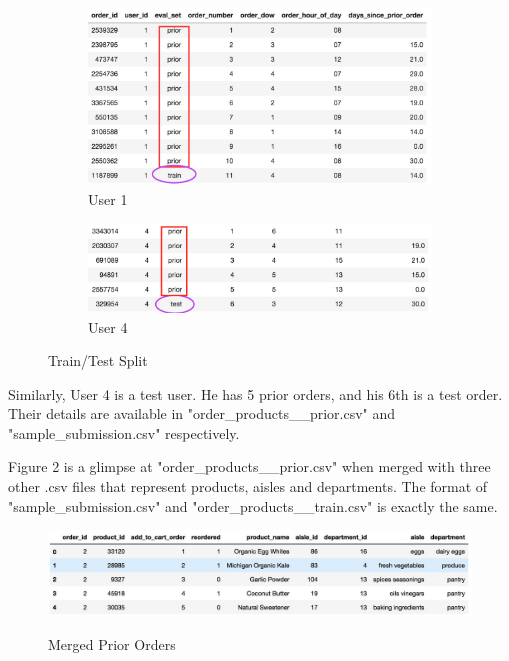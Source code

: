 \documentclass[letterpaper,12pt]{article}
\begin{document}
\begin{figure}[!bp]
  \begin{subfigure}[b]{0.4\textwidth}
    \includegraphics[width=\textwidth]{train_user.png}
    \caption{User 1}
    \label{fig:f1}
  \end{subfigure}
  \hfill
  \begin{subfigure}[b]{0.4\textwidth}
    \includegraphics[width=\textwidth]{test_user.png}
    \caption{User 4}
    \label{fig:f2}
  \end{subfigure}
  \caption{Train/Test Split}
\end{figure}

Similarly, User 4 is a test user. He has 5 prior orders, and his 6th is a test order. Their details are available in "order\_products\_\_prior.csv" and "sample\_submission.csv" respectively.

Figure 2 is a glimpse at "order\_products\_\_prior.csv" when merged with three other .csv files that represent products, aisles and departments. The format of "sample\_submission.csv" and "order\_products\_\_train.csv" is exactly the same.

\begin{figure}
	\centering
	\includegraphics[scale=0.2]{prior_df_merged} \\
	\caption{Merged Prior Orders}
\end{figure}	
\end{document}
